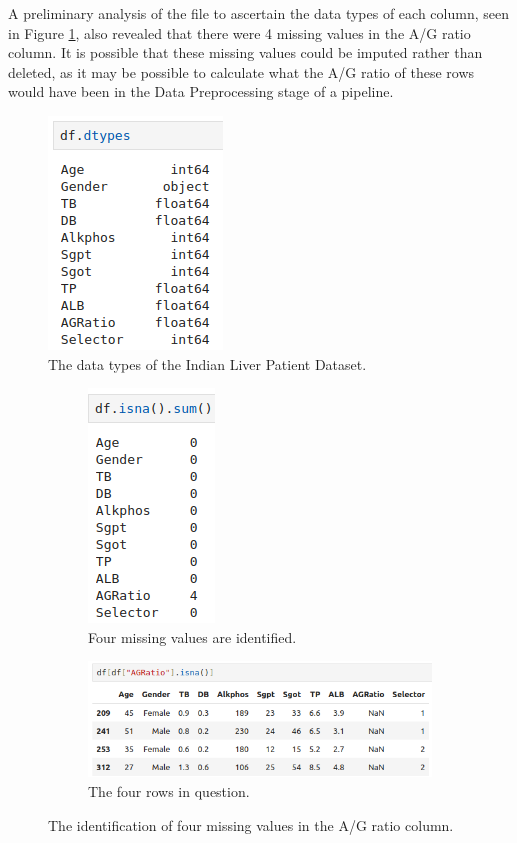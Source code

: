 \documentclass[12pt]{report}
\begin{document}
A preliminary analysis of the file to ascertain the data types of each column, seen in Figure \ref{fig:ILPD-DTypes}, also revealed that there were 4 missing values in the A/G ratio column.
It is possible that these missing values could be imputed rather than deleted, as it may be possible to calculate what the A/G ratio of these rows would have been in the 
Data Preprocessing stage of a pipeline.

\begin{figure}[H]
    \centering
    \includegraphics[width=.3\linewidth]{pandas/ILPD-DTypes.png}
    \caption{The data types of the Indian Liver Patient Dataset.}
    \label{fig:ILPD-DTypes}
\end{figure}

\begin{figure}[H]
    \centering
    \begin{subfigure}{0.75\textwidth}
        \centering
       \includegraphics[width=0.3\linewidth]{pandas/ILPD-NA.png}
       \caption{Four missing values are identified.}
       \label{fig:NAs1} 
    \end{subfigure}
    
    \begin{subfigure}{1\textwidth}
        \centering
       \includegraphics[width=1\linewidth]{pandas/ILPD-NAValues.png}
       \caption{The four rows in question.}
       \label{fig:NAs2}
    \end{subfigure}
    \caption{The identification of four missing values in the A/G ratio column.}
\end{figure}
\end{document}
